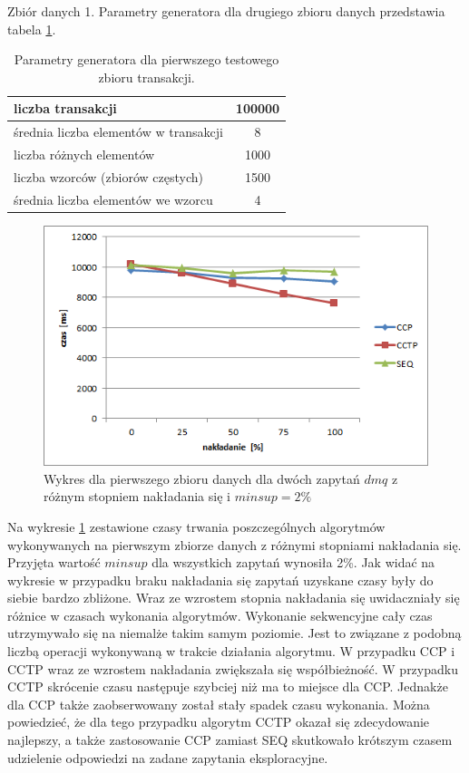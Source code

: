 Zbiór danych 1. Parametry generatora dla drugiego zbioru danych przedstawia tabela \ref{table:firstDataSetParams}.
\begin{table}[h]
\begin{center}
	\begin{tabular}{| l | c |}
		\hline
		liczba transakcji & 100000 \\ \hline
		średnia liczba elementów w transakcji & 8 \\ \hline
		liczba różnych elementów & 1000 \\ \hline
		liczba wzorców (zbiorów częstych) & 1500 \\ \hline
		średnia liczba elementów we wzorcu & 4 \\ 
		\hline
	\end{tabular}
\end{center}
\caption{Parametry generatora dla pierwszego testowego zbioru transakcji.}
\label{table:firstDataSetParams}
\end{table}

\begin{figure}[h]
	\centering
	\includegraphics[width=0.8\linewidth]{figures/chart_100_2}
	\caption{Wykres dla pierwszego zbioru danych dla dwóch zapytań \(dmq\) z różnym stopniem nakładania się i \(minsup = 2\%\)}
	\label{fig:chart_100_2}
\end{figure}

Na wykresie \ref{fig:chart_100_2} zestawione czasy trwania poszczególnych algorytmów wykonywanych na pierwszym zbiorze danych z różnymi stopniami nakładania się. Przyjęta wartość \(minsup\) dla wszystkich zapytań wynosiła 2\%. Jak widać na wykresie w przypadku braku nakładania się zapytań uzyskane czasy były do siebie bardzo zbliżone. Wraz ze wzrostem stopnia nakładania się uwidaczniały się różnice w czasach wykonania algorytmów. Wykonanie sekwencyjne cały czas utrzymywało się na niemalże takim samym poziomie. Jest to związane z podobną liczbą operacji wykonywaną w trakcie działania algorytmu. W przypadku CCP i CCTP wraz ze wzrostem nakładania zwiększała się współbieżność. W przypadku CCTP skrócenie czasu następuje szybciej niż ma to miejsce dla CCP. Jednakże dla CCP także zaobserwowany został stały spadek czasu wykonania. Można powiedzieć, że dla tego przypadku algorytm CCTP okazał się zdecydowanie najlepszy, a także zastosowanie CCP zamiast SEQ skutkowało krótszym czasem udzielenie odpowiedzi na zadane zapytania eksploracyjne.

